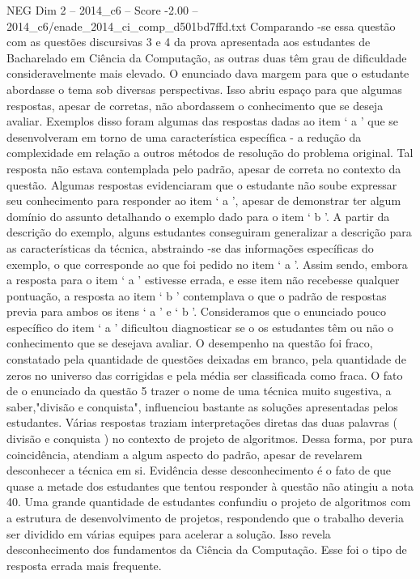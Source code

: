 \begin{textsample}{NEG Dim 2 – 2014\_c6 – Score -2.00 – 2014\_c6/enade\_2014\_ci\_comp\_d501bd7ffd.txt}
Comparando -se essa questão com as questões discursivas 3 e 4 da prova apresentada aos estudantes de Bacharelado em Ciência da Computação, as outras duas têm grau de dificuldade consideravelmente mais elevado.
O enunciado dava margem para que o estudante abordasse o tema sob diversas perspectivas.
Isso abriu espaço para que algumas respostas, apesar de corretas, não abordassem o conhecimento que se deseja avaliar.
Exemplos disso foram algumas das respostas dadas ao item ‘ a ’ que se desenvolveram em torno de uma característica específica - a redução da complexidade em relação a outros métodos de resolução do problema original.
Tal resposta não estava contemplada pelo padrão, apesar de correta no contexto da questão.
Algumas respostas evidenciaram que o estudante não soube expressar seu conhecimento para responder ao item ‘ a ’, apesar de demonstrar ter algum domínio do assunto detalhando o exemplo dado para o item ‘ b ’.
A partir da descrição do exemplo, alguns estudantes conseguiram generalizar a descrição para as características da técnica, abstraindo -se das informações específicas do exemplo, o que corresponde ao que foi pedido no item ‘ a ’.
Assim sendo, embora a resposta para o item ‘ a ’ estivesse errada, e esse item não recebesse qualquer pontuação, a resposta ao item ‘ b ’ contemplava o que o padrão de respostas previa para ambos os itens ‘ a ’ e ‘ b ’.
Consideramos que o enunciado pouco específico do item ‘ a ’ dificultou diagnosticar se o os estudantes têm ou não o conhecimento que se desejava avaliar.
O desempenho na questão foi fraco, constatado pela quantidade de questões deixadas em branco, pela quantidade de zeros no universo das corrigidas e pela média ser classificada como fraca.
O fato de o enunciado da questão 5 trazer o nome de uma técnica muito sugestiva, a saber,"divisão e conquista", influenciou bastante as soluções apresentadas pelos estudantes.
Várias respostas traziam interpretações diretas das duas palavras ( divisão e conquista ) no contexto de projeto de algoritmos.
Dessa forma, por pura coincidência, atendiam a algum aspecto do padrão, apesar de revelarem desconhecer a técnica em si.
Evidência desse desconhecimento é o fato de que quase a metade dos estudantes que tentou responder à questão não atingiu a nota 40.
Uma grande quantidade de estudantes confundiu o projeto de algoritmos com a estrutura de desenvolvimento de projetos, respondendo que o trabalho deveria ser dividido em várias equipes para acelerar a solução.
Isso revela desconhecimento dos fundamentos da Ciência da Computação.
Esse foi o tipo de resposta errada mais frequente.

\end{textsample}
